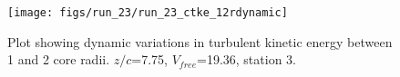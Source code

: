 \begin{figure}[H]
\centering
\texttt{[image: figs/run\_23/run\_23\_ctke\_12rdynamic]}
\caption{Plot showing dynamic variations in turbulent kinetic energy between 1 and 2 core radii. $z/c$=7.75, $V_{free}$=19.36, station 3.}
\label{fig:run_23_ctke_12rdynamic}
\end{figure}


